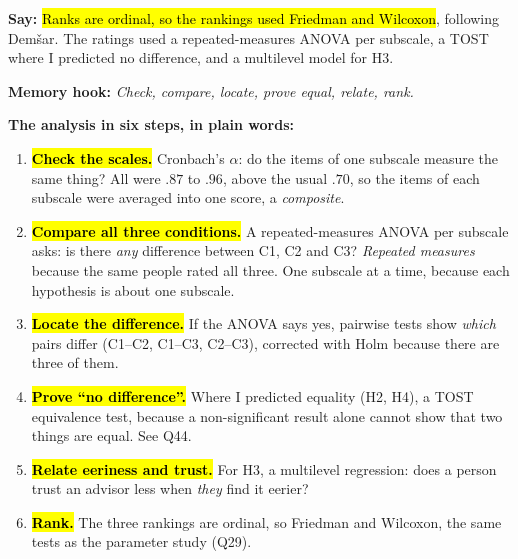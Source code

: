 \documentclass[11pt,a4paper]{article}
\newcommand{\key}[1]{\hl{#1}}
\newcommand{\hook}[1]{{\setlength{\fboxsep}{1.5pt}\colorbox{hlyellow}{\color{black}#1}}}
\newcommand{\say}[1]{\begin{tcolorbox}[colback=knlight,colframe=knblue,boxrule=0.5pt,left=6pt,right=6pt,top=4pt,bottom=4pt]\textbf{Say:} #1\end{tcolorbox}}
\begin{document}
\say{\key{Ranks are ordinal, so the rankings used Friedman and Wilcoxon}, following Demšar. The ratings used a repeated-measures ANOVA per subscale, a TOST where I predicted no difference, and a multilevel model for H3.}

{\small\color{kngrey}\textbf{Memory hook:} \hook{\emph{Check, compare, locate, prove equal, relate, rank.}}}

\textbf{The analysis in six steps, in plain words:}
\begin{enumerate}[leftmargin=1.4em,itemsep=0.15em,topsep=0.2em]
  \item \key{\textbf{Check the scales.}} Cronbach's $\alpha$: do the items of one subscale measure the same thing? All were $.87$ to $.96$, above the usual $.70$, so the items of each subscale were averaged into one score, a \emph{composite}.
  \item \key{\textbf{Compare all three conditions.}} A repeated-measures ANOVA per subscale asks: is there \emph{any} difference between C1, C2 and C3? \emph{Repeated measures} because the same people rated all three. One subscale at a time, because each hypothesis is about one subscale.
  \item \key{\textbf{Locate the difference.}} If the ANOVA says yes, pairwise tests show \emph{which} pairs differ (C1--C2, C1--C3, C2--C3), corrected with Holm because there are three of them.
  \item \key{\textbf{Prove ``no difference''.}} Where I predicted equality (H2, H4), a TOST equivalence test, because a non-significant result alone cannot show that two things are equal. See Q44.
  \item \key{\textbf{Relate eeriness and trust.}} For H3, a multilevel regression: does a person trust an advisor less when \emph{they} find it eerier?
  \item \key{\textbf{Rank.}} The three rankings are ordinal, so Friedman and Wilcoxon, the same tests as the parameter study (Q29).
\end{enumerate}
\end{document}
